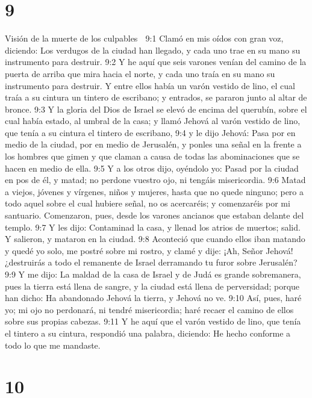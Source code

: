 \chapter{9}

Visión de la muerte de los culpables  

9:1 Clamó en mis oídos con gran voz, diciendo: Los verdugos de la ciudad han llegado, y cada uno trae en su mano su instrumento para destruir.  
9:2 Y he aquí que seis varones venían del camino de la puerta de arriba que mira hacia el norte, y cada uno traía en su mano su instrumento para destruir. Y entre ellos había un varón vestido de lino, el cual traía a su cintura un tintero de escribano; y entrados, se pararon junto al altar de bronce.  
9:3 Y la gloria del Dios de Israel se elevó de encima del querubín, sobre el cual había estado, al umbral de la casa; y llamó Jehová al varón vestido de lino, que tenía a su cintura el tintero de escribano,  
9:4 y le dijo Jehová: Pasa por en medio de la ciudad, por en medio de Jerusalén, y ponles una señal en la frente a los hombres que gimen y que claman a causa de todas las abominaciones que se hacen en medio de ella.  
9:5 Y a los otros dijo, oyéndolo yo: Pasad por la ciudad en pos de él, y matad; no perdone vuestro ojo, ni tengáis misericordia.  
9:6 Matad a viejos, jóvenes y vírgenes, niños y mujeres, hasta que no quede ninguno; pero a todo aquel sobre el cual hubiere señal, no os acercaréis; y comenzaréis por mi santuario. Comenzaron, pues, desde los varones ancianos que estaban delante del templo.  
9:7 Y les dijo: Contaminad la casa, y llenad los atrios de muertos; salid. Y salieron, y mataron en la ciudad.  
9:8 Aconteció que cuando ellos iban matando y quedé yo solo, me postré sobre mi rostro, y clamé y dije: ¡Ah, Señor Jehová! ¿destruirás a todo el remanente de Israel derramando tu furor sobre Jerusalén?  
9:9 Y me dijo: La maldad de la casa de Israel y de Judá es grande sobremanera, pues la tierra está llena de sangre, y la ciudad está llena de perversidad; porque han dicho: Ha abandonado Jehová la tierra, y Jehová no ve.  
9:10 Así, pues, haré yo; mi ojo no perdonará, ni tendré misericordia; haré recaer el camino de ellos sobre sus propias cabezas.  
9:11 Y he aquí que el varón vestido de lino, que tenía el tintero a su cintura, respondió una palabra, diciendo: He hecho conforme a todo lo que me mandaste.  

\chapter{10}

